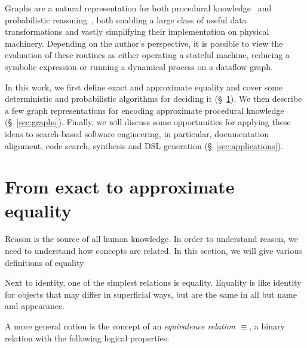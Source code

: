 \documentclass[11pt]{article}
\begin{document}
    Graphs are a natural representation for both procedural knowledge~\citep{allamanis2017learning} and probabilistic reasoning~\citep{pearl2014probabilistic}, both enabling a large class of useful data transformations and vastly simplifying their implementation on physical machinery. Depending on the author's perspective, it is possible to view the evaluation of these routines as either operating a stateful machine, reducing a symbolic expression or running a dynamical process on a dataflow graph.

    In this work, we first  define exact and approximate equality and cover some deterministic and probabilistic algorithms for deciding it (\S~\ref{sec:definitions}). We then describe a few graph representations for encoding approximate procedural knowledge (\S~\ref{sec:graphs}). Finally, we will discuss some opportunities for applying these ideas to search-based software engineering, in particular, documentation alignment, code search, synthesis and DSL generation (\S~\ref{sec:applications}).


    \section{From exact to approximate equality}\label{sec:definitions}

    Reason is the source of all human knowledge. In order to understand reason, we need to understand how concepts are related. In this section, we will give various definitions of equality

    Next to identity, one of the simplest relations is equality. Equality is like identity for objects that may differ in superficial ways, but are the same in all but name and appearance.

     A more general notion is the concept of an \textit{equivalence relation} $\equiv$, a binary relation with the following logical properties:

\end{document}
